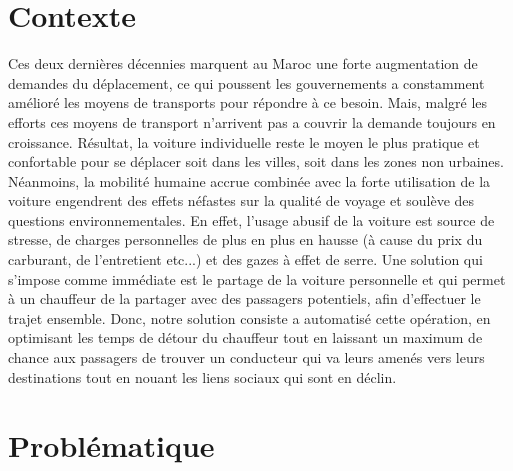 
\section{Contexte}

Ces deux dernières décennies marquent au Maroc une forte augmentation de demandes du déplacement, ce qui poussent les gouvernements a constamment amélioré les moyens de transports pour répondre à ce besoin.\newline
Mais, malgré les efforts ces moyens de transport n'arrivent pas a couvrir la demande toujours en croissance.\newline
Résultat, la voiture individuelle reste le moyen le plus pratique et confortable pour se déplacer soit dans les villes, soit dans les zones non urbaines. Néanmoins, la mobilité humaine accrue combinée avec la forte utilisation de la voiture engendrent des effets néfastes sur la qualité de voyage et soulève des questions environnementales.\newline
En effet, l'usage abusif de la voiture est source de stresse, de charges personnelles de plus en plus en hausse (à cause du prix du carburant, de l'entretient etc...) et des gazes à effet de serre.\newline
Une solution qui s'impose comme immédiate est le partage de la voiture personnelle et qui permet à un chauffeur de la partager avec des passagers potentiels, afin d'effectuer le trajet ensemble.\newline
Donc, notre solution consiste a automatisé cette opération, en optimisant les temps de détour du chauffeur tout en laissant un maximum de chance aux passagers de trouver un conducteur qui va leurs amenés vers leurs destinations tout en nouant les liens sociaux qui sont en déclin.

\section{Problématique}

